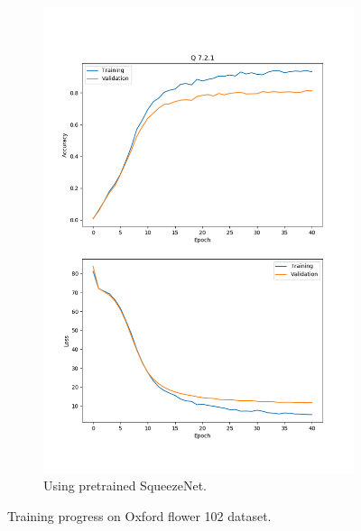 \documentclass[11pt]{article}
\begin{document}
\begin{figure}[h!]
\begin{subfigure}{.495\textwidth}
      \includegraphics[width=.9\linewidth]{../results/q7_2_1_102_squeeze.png}
      \caption{Using pretrained SqueezeNet. }
    \end{subfigure}\hfill
    \caption{Training progress on Oxford flower 102 dataset. }
    \label{fig:q7.2.2}
\end{figure}
\end{document}
